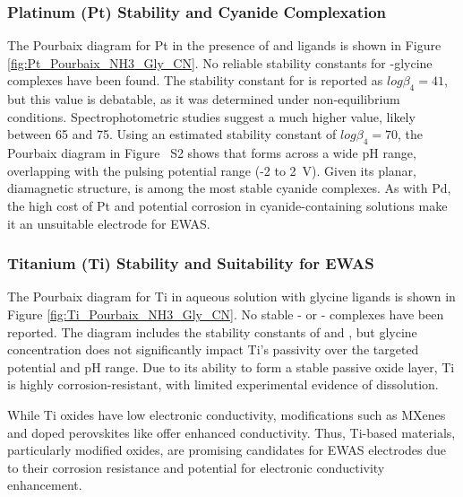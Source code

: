 \subsubsection{Platinum (Pt) Stability and Cyanide Complexation} 
The Pourbaix diagram for Pt in the presence of  and  ligands is shown in Figure \ref{fig:Pt_Pourbaix_NH3_Gly_CN}. No reliable stability constants for -glycine complexes have been found\cite{Kiss1991CriticalGlycine}. The stability constant for \ce{[Pt(CN)4^2+]} is reported as $log\beta_4 = 41$\cite{Smith1989CriticalConstants}, but this value is debatable, as it was determined under non-equilibrium conditions\cite{Hancock1976FormationTetrakiscyanopalladate2-}. Spectrophotometric studies suggest a much higher value, likely between 65 and 75. Using an estimated stability constant of $log\beta_4 = 70$, the Pourbaix diagram in Figure ~S2 shows that \ce{[Pt(CN)4^2+]} forms across a wide pH range, overlapping with the pulsing potential range (-2 to 2~V). Given its planar, diamagnetic structure, \ce{[Pt(CN)4^2+]} is among the most stable cyanide complexes\cite{Griffith1962CyanideMetals}. As with Pd, the high cost of Pt and potential corrosion in cyanide-containing solutions make it an unsuitable electrode for EWAS.

\subsubsection{Titanium (Ti) Stability and Suitability for EWAS}
The Pourbaix diagram for Ti in aqueous solution with glycine ligands is shown in Figure \ref{fig:Ti_Pourbaix_NH3_Gly_CN}. No stable - or - complexes have been reported\cite{Griffith1962CyanideMetals, Nicholls1980ComplexTitanium}. The diagram includes the stability constants of \ce{[Ti(Gly)^-]} and \ce{[Ti(Gly)_2^+]}, but glycine concentration does not significantly impact Ti's passivity over the targeted potential and pH range. Due to its ability to form a stable passive oxide layer\cite{Kiss1991CriticalGlycine, PourbaixAtlasSolutions}, Ti is highly corrosion-resistant, with limited experimental evidence of dissolution\cite{Schmidt2009AqueousVoltammetry, Ziemniak1993SolubilityTemperatures, Knauss2001TiIV300C, Schmidt2006DissolutionEffect, Pocsi1988ComplexAcid}.

While Ti oxides have low electronic conductivity, modifications such as MXenes\cite{Gardon2013ImprovedSpray, Naguib2012Two-DimensionalCarbides, Hui2022VacancyBatteries} and doped perovskites like \cite{Sokolov2024ComputationalTitanate} offer enhanced conductivity. Thus, Ti-based materials, particularly modified oxides, are promising candidates for EWAS electrodes due to their corrosion resistance and potential for electronic conductivity enhancement.

